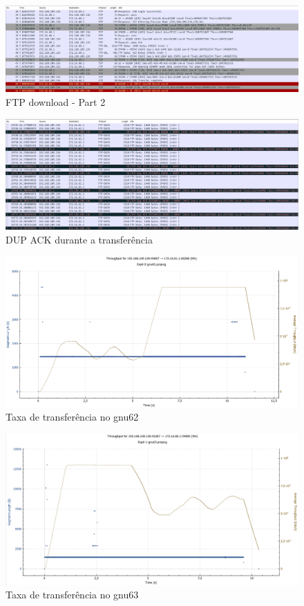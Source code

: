 \documentclass[article, a4paper, 11pt, oneside]{memoir}
\begin{document}
\begin{figure}[h]
	\centering
\includegraphics[scale=0.55]{exp6-step3-part2.png}
\caption{FTP download - Part 2}
\end{figure}

\newpage
\begin{figure}[h]
	\centering
\includegraphics[scale=0.55]{exp6-step5-error.png}
\caption{DUP ACK durante a transferência}
\end{figure}

\begin{figure}[h]
	\centering
\includegraphics[scale=0.30]{exp6-step5-gnu62-graph.png}
\caption{Taxa de transferência no gnu62}
\end{figure}

\begin{figure}[h]
	\centering
\includegraphics[scale=0.30]{exp6-step5-gnu63-graph.png}
\caption{Taxa de transferência no gnu63}
\end{figure}
\end{document}
